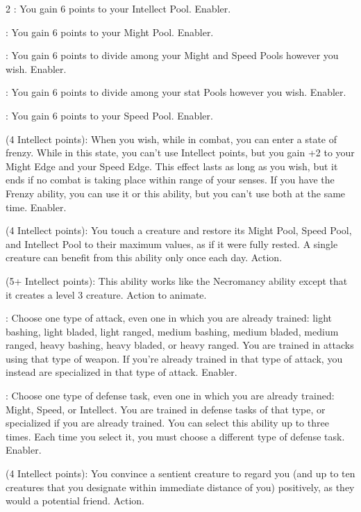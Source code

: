\begin{multicols}{2}
: You gain 6 points to your Intellect Pool. Enabler. 
 
: You gain 6 points to your Might Pool. Enabler. 
 
: You gain 6 points to divide among your Might and Speed Pools however you wish. Enabler. 
 
: You gain 6 points to divide among your stat Pools however you wish. Enabler. 
 
: You gain 6 points to your Speed Pool. Enabler. 
 
 (4 Intellect points): When you wish, while in combat, you can enter a state of frenzy. While in this state, you can’t use Intellect points, but you gain +2 to your Might Edge and your Speed Edge. This effect lasts as long as you wish, but it ends if no combat is taking place within range of your senses. If you have the Frenzy ability, you can use it or this ability, but you can’t use both at the same time. Enabler. 
 
 (4 Intellect points): You touch a creature and restore its Might Pool, Speed Pool, and Intellect Pool to their maximum values, as if it were fully rested. A single creature can benefit from this ability only once each day. Action. 
 
 (5+ Intellect points): This ability works like the Necromancy ability except that it creates a level 3 creature. Action to animate. 
 
: Choose one type of attack, even one in which you are already trained: light bashing, light bladed, light ranged, medium bashing, medium bladed, medium ranged, heavy bashing, heavy bladed, or heavy ranged. You are trained in attacks using that type of weapon. If you’re already trained in that type of attack, you instead are specialized in that type of attack. Enabler. 
 
: Choose one type of defense task, even one in which you are already trained: Might, Speed, or Intellect. You are trained in defense tasks of that type, or specialized if you are already trained. You can select this ability up to three times. Each time you select it, you must choose a different type of defense task. Enabler. 
 
 (4 Intellect points): You convince a sentient creature to regard you (and up to ten creatures that you designate within immediate distance of you) positively, as they would a potential friend. Action. 
 

\end{multicols}
